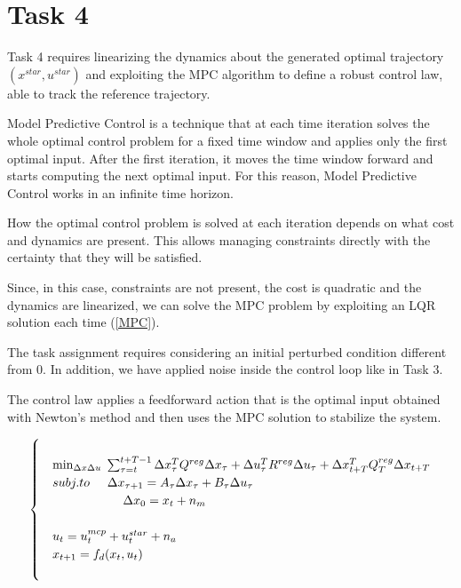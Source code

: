 \chapter*{Task 4}

Task 4 requires linearizing the dynamics about the generated optimal trajectory $(x^{star},u^{star})$ and exploiting the MPC algorithm to define a robust control law, able to track the reference trajectory.

Model Predictive Control is a technique that at each time iteration solves the whole optimal control problem for a fixed time window and applies only the first optimal input. After the first iteration, it moves the time window forward and starts computing the next optimal input. For this reason, Model Predictive Control works in an infinite time horizon.

How the optimal control problem is solved at each iteration depends on what cost and dynamics are present. This allows managing constraints directly with the certainty that they will be satisfied.

Since, in this case, constraints are not present, the cost is quadratic and the dynamics are linearized, we can solve the MPC problem by exploiting an LQR solution each time (\ref{MPC}).

The task assignment requires considering an initial perturbed condition different from 0. In addition, we have applied noise inside the control loop like in Task 3.

The control law applies a feedforward action that is the optimal input obtained with Newton's method and then uses the MPC solution to stabilize the system.

\begin{equation} \label{MPC}
    \begin{cases}
        &\\
        &\min_{\Delta x \Delta u} \hspace{0.1cm} \sum_{\tau=t}^{t+T-1} \Delta x_{\tau}^TQ^{reg}\Delta x_{\tau} + \Delta u_{\tau}^TR^{reg}\Delta u_{\tau} + \Delta x_{t+T} ^TQ_T^{reg}\Delta x_{t+T} \\
        &subj. to \hspace{0.5cm} \Delta x_{\tau+1} = A_{\tau} \Delta x_{\tau}  + B_{\tau} \Delta u_{\tau} \\
        & \hspace{2cm} \Delta x_0 =  x_t + n_m \\
        &\\
        &{u}_t = u_t^{mcp} + u_t^{star} + n_a\\
        &{x}_{t+1} = f_d(x_t,u_t)\\
        &
    \end{cases}
\end{equation}

